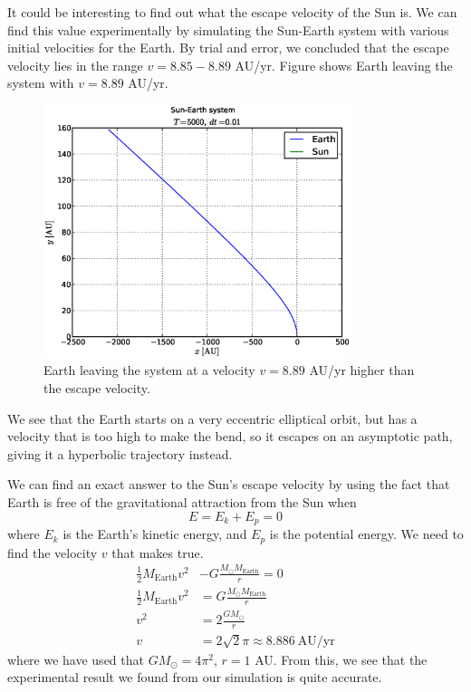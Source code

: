 
It could be interesting to find out what the escape velocity of the Sun is. We
can find this value experimentally by simulating the Sun-Earth system with
various initial velocities for the Earth. By trial and error, we concluded that
the escape velocity lies in the range $v = 8.85 - 8.89$ AU/yr. Figure
 shows Earth leaving the system with $v = 8.89$ AU/yr.
%
\begin{figure}[htpb]
	\centering
	\includegraphics[width=0.8\textwidth]{figures/sun_earth_T5000_dt1e-2}
	\caption{Earth leaving the system at a velocity $v = 8.89$ AU/yr higher
		than the escape	velocity.}
	\label{fig:escapevel}
\end{figure}
%
We see that the Earth starts on a very eccentric elliptical orbit, but has a
velocity that is too high to make the bend, so it escapes on an asymptotic
path, giving it a hyperbolic trajectory instead.

We can find an exact answer to the Sun's escape velocity by using the fact that
Earth is free of the gravitational attraction from the Sun when
\begin{equation}
	E = E_k + E_p = 0
	\label{eq:Eequal0}
\end{equation}
where $E_k$ is the Earth's kinetic energy, and $E_p$ is the potential energy. We
need to find the velocity $v$ that makes  true.
%
\begin{align*}
	\frac{1}{2}M_{\text{Earth}}v^2 &- G \frac{M_{\odot} M_{\text{Earth}}}{r}
	= 0 \\
	\frac{1}{2}M_{\text{Earth}}v^2 &= G \frac{M_{\odot} M_{\text{Earth}}}{r} \\
	v^2 &= 2\frac{GM_{\odot}}{r} \\
	v &= 2\sqrt{2}\pi \approx 8.886 \ \text{AU/yr}
\end{align*}
%
where we have used that $GM_{\odot} = 4\pi^2$, $r = 1$ AU. From this, we see
that the experimental result we found from our simulation is quite accurate.
